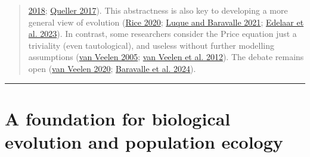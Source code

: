 \documentclass[
]{article}
\begin{document}
\begin{quote}
\protect\hyperlink{ref-Lehtonen2018}{2018};
\protect\hyperlink{ref-Queller2017}{Queller 2017}). This abstractness is
also key to developing a more general view of evolution
(\protect\hyperlink{ref-Rice2020}{Rice 2020};
\protect\hyperlink{ref-Luque2021}{Luque and Baravalle 2021};
\protect\hyperlink{ref-Edelaar2023}{Edelaar et al. 2023}). In contrast,
some researchers consider the Price equation just a triviality (even
tautological), and useless without further modelling assumptions
(\protect\hyperlink{ref-VanVeelen2005}{van Veelen 2005};
\protect\hyperlink{ref-VanVeelen2012}{van Veelen et al. 2012}). The
debate remains open (\protect\hyperlink{ref-VanVeelen2020}{van Veelen
2020}; \protect\hyperlink{ref-Baravalle2024}{Baravalle et al. 2024}).
\end{quote}

\begin{center}\rule{0.5\linewidth}{0.5pt}\end{center}

\hypertarget{a-foundation-for-biological-evolution-and-population-ecology}{%
\section{A foundation for biological evolution and population
ecology}\label{a-foundation-for-biological-evolution-and-population-ecology}}
\end{document}
